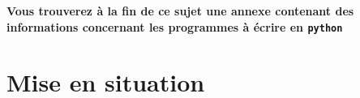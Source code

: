 %
%
%
%
%
%


\ifprof
\else

\textbf{Vous trouverez à la fin de ce sujet une annexe contenant des informations concernant les programmes à écrire en 
\texttt{python}}
\fi

\section{Mise en situation}
\ifprof
\else
\vspace{.25cm}

